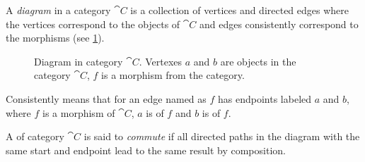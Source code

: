 \begin{definition}[Diagram]
  \label{def:diagram}
  A \textit{diagram} in a category $\cat{C}$ is a collection of
  vertices and directed edges where the vertices correspond to the
  objects of $\cat{C}$ and edges consistently correspond to the
  morphisms (see \ref{fig:diagramm}).

  \begin{figure}[H]
    \centering
    \caption{Diagram in category $\cat{C}$. Vertexes $a$ and $b$ are
      objects in the category $\cat{C}$, $f$ is a morphism from the category.}
   \label{fig:diagramm}
  \end{figure}

  
  Consistently means that for an edge named as $f$ has endpoints
  labeled $a$ and $b$, where $f$ is a morphism of $\cat{C}$, $a$ is  of $f$ and
  $b$ is  of $f$. 
\end{definition}

\begin{definition}
  \label{def:commutative_diagram}
  A  of category $\cat{C}$ is said to
  \textit{commute} if all directed paths in the diagram with the same
  start and endpoint lead to the same result by composition.
\end{definition}

